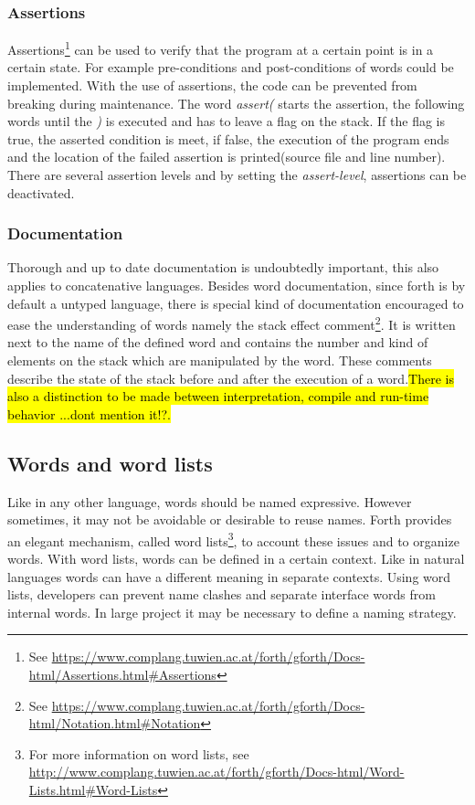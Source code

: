 \subsubsection*{Assertions}
Assertions\footnote{See \url{https://www.complang.tuwien.ac.at/forth/gforth/Docs-html/Assertions.html\#Assertions}} can be used to verify that the program at a certain point is in a certain state. For example pre-conditions and post-conditions of words could be implemented. With the use of assertions, the code can be prevented from breaking during maintenance. The word \emph{assert(} starts the assertion, the following words until the \emph{)} is executed and has to leave a flag on the stack. If the flag is true, the asserted condition is meet, if false, the execution of the program ends and the location of the failed assertion is printed(source file and line number).\\
There are several assertion levels and by setting the \emph{assert-level}, assertions can be deactivated.

\subsubsection*{Documentation}
Thorough and up to date documentation is undoubtedly important, this also applies to concatenative languages. Besides word documentation, since forth is by default a untyped language, there is special kind of documentation encouraged to ease the understanding of words namely the stack effect comment\footnote{See \url{https://www.complang.tuwien.ac.at/forth/gforth/Docs-html/Notation.html\#Notation}}. It is written next to the name of the defined word and contains the number and kind of elements on the stack which are manipulated by the word. These comments describe the state of the stack before and after the execution of a word.\hl{There is also a distinction to be made between interpretation, compile and run-time behavior ...dont mention it!?.}

\subsection*{Words and word lists}
Like in any other language, words should be named expressive. However sometimes, it may not be avoidable or desirable to reuse names. Forth provides an elegant mechanism, called word lists\footnote{For more information on word lists, see \url{http://www.complang.tuwien.ac.at/forth/gforth/Docs-html/Word-Lists.html\#Word-Lists}}, to account these issues and to organize words. With word lists, words can be defined in a certain context. Like in natural languages words can have a different meaning in separate contexts. Using word lists, developers can prevent name clashes and separate interface words from internal words. In large project it may be necessary to define a naming strategy.

